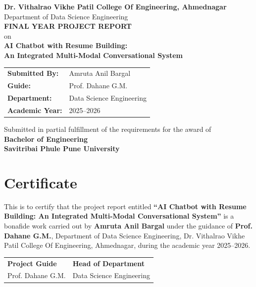 \documentclass[12pt,a4paper]{report}
\begin{document}
\begin{titlepage}
\centering
\vspace*{1cm}
{\Large \textbf{Dr. Vithalrao Vikhe Patil College Of Engineering, Ahmednagar}}\\[0.6cm]
{\large Department of Data Science Engineering}\\[1.6cm]

{\Huge \textbf{FINAL YEAR PROJECT REPORT}}\\[0.6cm]
{\Large on}\\[0.4cm]
{\LARGE \textbf{AI Chatbot with Resume Building:}}\\
{\LARGE \textbf{An Integrated Multi-Modal Conversational System}}\\[1.6cm]

\begin{tabular}{>{\bfseries}p{2.3in} p{3.0in}}
Submitted By: & Amruta Anil Bargal \\
Guide: & Prof. Dahane G.M. \\
Department: & Data Science Engineering \\
Academic Year: & 2025--2026 \\
\end{tabular}

\vfill
{\large Submitted in partial fulfillment of the requirements for the award of}\\
{\large \textbf{Bachelor of Engineering}}\\[0.8cm]
{\large \textbf{Savitribai Phule Pune University}}
\end{titlepage}

\chapter*{Certificate}
This is to certify that the project report entitled \textbf{``AI Chatbot with Resume Building: An Integrated Multi-Modal Conversational System''} is a bonafide work carried out by \textbf{Amruta Anil Bargal} under the guidance of \textbf{Prof. Dahane G.M.}, Department of Data Science Engineering, Dr. Vithalrao Vikhe Patil College Of Engineering, Ahmednagar, during the academic year 2025--2026.

\vspace{1.2in}
\noindent
\begin{tabular}{p{2.5in} p{2.5in}}
\textbf{Project Guide} & \textbf{Head of Department}\\
Prof. Dahane G.M. & Data Science Engineering
\end{tabular}
\end{document}
